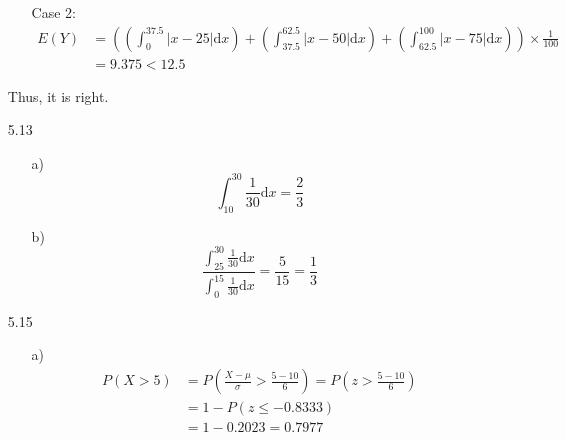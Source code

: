 \documentclass{article}
\begin{document}
\begin{itemize}
\begin{itemize}
        \item [Case 2:] 
        \begin{align*}
            E(Y)&= \left(\left(\int_{0}^{37.5}|x-25|\text{d}x\right)+\left(\int_{37.5}^{62.5}|x-50|\text{d}x\right)+\left(\int_{62.5}^{100}|x-75|\text{d}x\right)\right)\times \frac{1}{100}\\
                &= 9.375 < 12.5
            \end{align*}
    \end{itemize}
    Thus, it is right.
    \item [5.13]
    \begin{itemize}
        \item [a)]
        \[\int_{10}^{30}\frac{1}{30}\text{d}x=\frac{2}{3}\]
        \item [b)]
        \[\frac{\int_{25}^{30}\frac{1}{30}\text{d}x}{\int_{0}^{15}\frac{1}{30}\text{d}x}=\frac{5}{15}=\frac{1}{3}\]
    \end{itemize}
    \item [5.15]
    \begin{itemize}
        \item [a)]\begin{align*}
            P(X > 5) &= P\left(\frac{X - \mu}{\sigma} > \frac{5 - 10}{6}\right) = P\left(z > \frac{5 - 10}{6}\right) \\
            &= 1 - P\left(z \leq -0.8333\right)\\
            &=1 - 0.2023 = 0.7977
        \end{align*}


\end{itemize}
\end{itemize}
\end{document}
